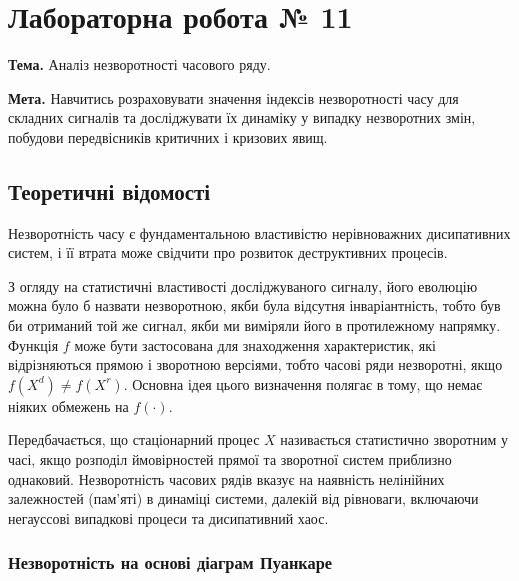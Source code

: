 \documentclass[
  letterpaper,
]{report}
\begin{document}

\hypertarget{ux43bux430ux431ux43eux440ux430ux442ux43eux440ux43dux430-ux440ux43eux431ux43eux442ux430-11}{%
\chapter{Лабораторна робота №
11}\label{ux43bux430ux431ux43eux440ux430ux442ux43eux440ux43dux430-ux440ux43eux431ux43eux442ux430-11}}

\textbf{Тема.} Аналіз незворотності часового ряду.

\textbf{Мета.} Навчитись розраховувати значення індексів незворотності
часу для складних сигналів та досліджувати їх динаміку у випадку
незворотних змін, побудови передвісників критичних і кризових явищ.

\hypertarget{ux442ux435ux43eux440ux435ux442ux438ux447ux43dux456-ux432ux456ux434ux43eux43cux43eux441ux442ux456-6}{%
\section{Теоретичні
відомості}\label{ux442ux435ux43eux440ux435ux442ux438ux447ux43dux456-ux432ux456ux434ux43eux43cux43eux441ux442ux456-6}}

Незворотність часу є фундаментальною властивістю нерівноважних
дисипативних систем, і її втрата може свідчити про розвиток
деструктивних процесів.

З огляду на статистичні властивості досліджуваного сигналу, його
еволюцію можна було б назвати незворотною, якби була відсутня
інваріантність, тобто був би отриманий той же сигнал, якби ми виміряли
його в протилежному напрямку. Функція \(f\) може бути застосована для
знаходження характеристик, які відрізняються прямою і зворотною
версіями, тобто часові ряди незворотні, якщо \(f(X^d) \neq f(X^r)\).
Основна ідея цього визначення полягає в тому, що немає ніяких обмежень
на \(f(\cdot )\).

Передбачається, що стаціонарний процес \(X\) називається статистично
зворотним у часі, якщо розподіл ймовірностей прямої та зворотної систем
приблизно однаковий. Незворотність часових рядів вказує на наявність
нелінійних залежностей (пам'яті) в динаміці системи, далекій від
рівноваги, включаючи негауссові випадкові процеси та дисипативний хаос.

\hypertarget{ux43dux435ux437ux432ux43eux440ux43eux442ux43dux456ux441ux442ux44c-ux43dux430-ux43eux441ux43dux43eux432ux456-ux434ux456ux430ux433ux440ux430ux43c-ux43fux443ux430ux43dux43aux430ux440ux435}{%
\subsection{Незворотність на основі діаграм
Пуанкаре}\label{ux43dux435ux437ux432ux43eux440ux43eux442ux43dux456ux441ux442ux44c-ux43dux430-ux43eux441ux43dux43eux432ux456-ux434ux456ux430ux433ux440ux430ux43c-ux43fux443ux430ux43dux43aux430ux440ux435}}
\end{document}
